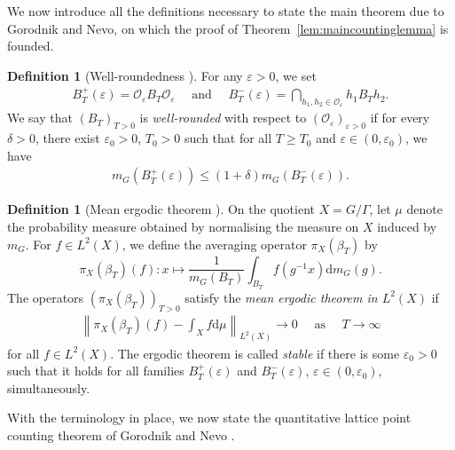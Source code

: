 \documentclass[11pt,reqno]{amsart}
\theoremstyle{definition}
\newtheorem{definition}[thm]{Definition}
\theoremstyle{remark}
\numberwithin{equation}{section}
\numberwithin{thm}{section}
\numberwithin{table}{section}
\begin{document}
We now introduce all the definitions necessary to state the main theorem due to Gorodnik and Nevo, on which the proof of Theorem~\ref{lem:maincountinglemma}
 is founded.

\begin{definition}[{Well-roundedness \cite[Definition~1.1]{gorodnik_nevo}}] \label{def:wellrounded}
    For
 any $\varepsilon > 0$, we set
\begin{align*}
    B^{+}_T (\varepsilon)= \mathcal{O}_\varepsilon B_T \mathcal{O}_\varepsilon \quad \text{ and } 
    \quad 
    B^{-}_T (\varepsilon) =\bigcap_{h_1, h_2 \in \mathcal{O}_\varepsilon} h_1 B_T h_2.
\end{align*}
We say that $(B_T)_{T>0}$ is {\it well-rounded} with respect to $(\mathcal{O}_\varepsilon)_{\varepsilon > 0}$ if for every $\delta >0$, there exist $\varepsilon_0 >0$, $ T_0>0$ such that for all $T \ge T_0$ and $ \varepsilon \in (0, \varepsilon_0)$, we have 
\begin{align*}
    m_G(B^{+}_T (\varepsilon)) \le (1 + \delta) m_G(B^{-}_T (\varepsilon)).
\end{align*}


\end{definition}



\begin{definition}[{Mean ergodic theorem \cite[Definition~1.4]{gorodnik_nevo}}] \label{def:meanergodictheorem}
       On the quotient $X = G/\Gamma$, let $\mu$ denote the  probability measure  obtained by normalising the measure on $X$ induced by $m_G$. For $f \in L^2(X)$, we define the averaging operator $\pi_X(\beta_T)$ by 
       \[ \pi_X(\beta_T)(f): x \longmapsto 
       \frac{1}{m_G(B_T)}
       \int_{B_T}
       f(g^{-1}x)\mathrm{d}m_G(g).
       \]
        The operators $(\pi_X(\beta_T))_{T>0}$
       satisfy the {\it mean ergodic theorem in $L^2(X)$} 
       if
       \begin{align*}
           \left\|
           \pi_X(\beta_T)(f) -  
           \int_X
           f \mathrm{d} \mu
           \right\|_{L^2(X)} \longrightarrow 0 \quad \text{ as } \quad T \to \infty
       \end{align*}
       for all $f \in L^2(X)$. The ergodic theorem is called \textit{stable} if there is some $\varepsilon_0>0$ such that it holds for all families $B_T^+(\varepsilon)$ and $B_T^-(\varepsilon)$, $\varepsilon \in (0,\varepsilon_0)$, simultaneously. 
\end{definition}

With the terminology in place, we now state the quantitative lattice point counting theorem of Gorodnik and Nevo \cite[Theorem~1.7]{gorodnik_nevo}.
\end{document}
